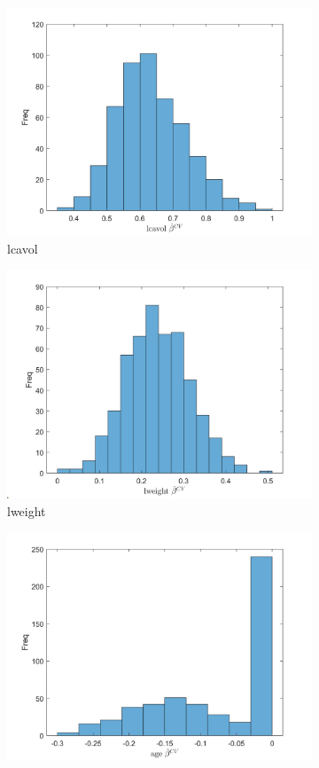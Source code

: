 \documentclass{article}
\begin{document}
	\begin{figure}[ht] 
		\begin{subfigure}[b]{0.5\linewidth}
			\centering
			\includegraphics[width=0.75\linewidth]{figures/q8_2.jpg} 
			\caption{lcavol} 
			\label{lcavol} 
			\vspace{4ex}
		\end{subfigure}%
		\begin{subfigure}[b]{0.5\linewidth}
			\centering
			\includegraphics[width=0.75\linewidth]{figures/q8_3.jpg} 
			\caption{lweight} 
			\label{lweight} 
			\vspace{4ex}
		\end{subfigure} 
		\begin{subfigure}[b]{0.5\linewidth}
			\centering
			\includegraphics[width=0.75\linewidth]{figures/q8_4.jpg} 

\end{subfigure}
\end{figure}
\end{document}
